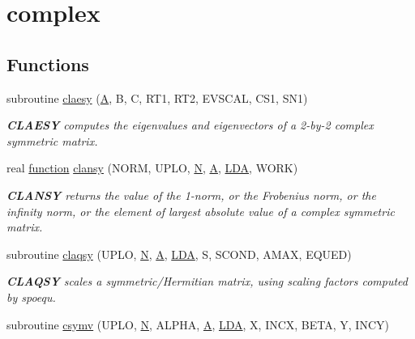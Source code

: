 \hypertarget{group__complexSYauxiliary}{}\section{complex}
\label{group__complexSYauxiliary}
\subsection*{Functions}
\begin{DoxyCompactItemize}
\item 
subroutine \hyperlink{group__complexSYauxiliary_gad7bdd5e02c8e280c12ff9fba3c712dd6}{claesy} (\hyperlink{classA}{A}, B, C, R\+T1, R\+T2, E\+V\+S\+C\+A\+L, C\+S1, S\+N1)
\begin{DoxyCompactList}\small\item\em {\bfseries C\+L\+A\+E\+S\+Y} computes the eigenvalues and eigenvectors of a 2-\/by-\/2 complex symmetric matrix. \end{DoxyCompactList}\item 
real \hyperlink{afunc_8m_a7b5e596df91eadea6c537c0825e894a7}{function} \hyperlink{group__complexSYauxiliary_gad2c86a28190eb12c91cda1c4faef5df7}{clansy} (N\+O\+R\+M, U\+P\+L\+O, \hyperlink{polmisc_8c_a0240ac851181b84ac374872dc5434ee4}{N}, \hyperlink{classA}{A}, \hyperlink{example__user_8c_ae946da542ce0db94dced19b2ecefd1aa}{L\+D\+A}, W\+O\+R\+K)
\begin{DoxyCompactList}\small\item\em {\bfseries C\+L\+A\+N\+S\+Y} returns the value of the 1-\/norm, or the Frobenius norm, or the infinity norm, or the element of largest absolute value of a complex symmetric matrix. \end{DoxyCompactList}\item 
subroutine \hyperlink{group__complexSYauxiliary_gab12daf202264e97ef334a0d8125497b8}{claqsy} (U\+P\+L\+O, \hyperlink{polmisc_8c_a0240ac851181b84ac374872dc5434ee4}{N}, \hyperlink{classA}{A}, \hyperlink{example__user_8c_ae946da542ce0db94dced19b2ecefd1aa}{L\+D\+A}, S, S\+C\+O\+N\+D, A\+M\+A\+X, E\+Q\+U\+E\+D)
\begin{DoxyCompactList}\small\item\em {\bfseries C\+L\+A\+Q\+S\+Y} scales a symmetric/\+Hermitian matrix, using scaling factors computed by spoequ. \end{DoxyCompactList}\item 
subroutine \hyperlink{group__complexSYauxiliary_gae013512af4fd2c59629f1708ca4de36a}{csymv} (U\+P\+L\+O, \hyperlink{polmisc_8c_a0240ac851181b84ac374872dc5434ee4}{N}, A\+L\+P\+H\+A, \hyperlink{classA}{A}, \hyperlink{example__user_8c_ae946da542ce0db94dced19b2ecefd1aa}{L\+D\+A}, X, I\+N\+C\+X, B\+E\+T\+A, Y, I\+N\+C\+Y)

\end{DoxyCompactItemize}
